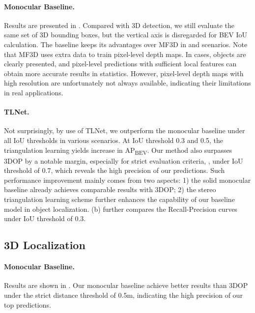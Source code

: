 \paragraph{Monocular Baseline.} Results are presented in \tab{\ref{tab:bvap}}. Compared with 3D detection, we still evaluate the same set of 3D bounding boxes, but the vertical axis is disregarded for BEV IoU calculation. The baseline keeps its advantages over MF3D in  and  scenarios. Note that MF3D uses extra data to train pixel-level depth maps. In  cases, objects are clearly presented, and pixel-level predictions with sufficient local features can obtain more accurate results in statistics. However, pixel-level depth maps with high resolution are unfortunately not always available, indicating their limitations in real applications.

\vspace{-0.2cm}
\paragraph{TLNet.} Not surprisingly, by use of TLNet, we outperform the monocular baseline under all IoU thresholds in various scenarios. At IoU threshold 0.3 and 0.5, the triangulation learning yields  increase in AP\textsubscript{BEV}. Our method also surpasses 3DOP by a notable margin, especially for strict evaluation criteria, \eg, under IoU threshold of 0.7, which reveals the high precision of our predictions. Such performance improvement mainly comes from two aspects: 1) the solid monocular baseline already achieves comparable results with 3DOP; 2) the stereo triangulation learning scheme further enhances the capability of our baseline model in object localization. \fig{\ref{fig:apcurves}} (b) further compares the Recall-Precision curves under IoU threshold of 0.3.



\subsection{3D Localization}
\paragraph{Monocular Baseline.} Results are shown in \tab{\ref{tab:3dloc}}. Our monocular baseline achieve better results than 3DOP~\cite{chen20153dop} under the strict distance threshold of 0.5m, indicating the high precision of our top predictions. 

\vspace{-0.1cm}
